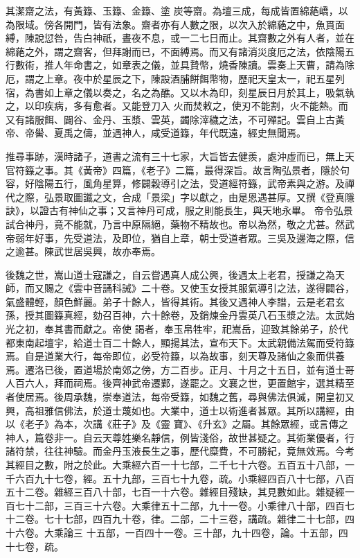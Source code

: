 \begin{pinyinscope}
 其潔齋之法，有黃籙、玉籙、金籙、塗
 炭等齋。為壇三成，每成皆置綿蕝嶠，以為限域。傍各開門，皆有法象。齋者亦有人數之限，以次入於綿蕝之中，魚貫面縛，陳說愆咎，告白神祇，晝夜不息，或一二七日而止。其齋數之外有人者，並在綿蕝之外，謂之齋客，但拜謝而已，不面縛焉。而又有諸消災度厄之法，依陰陽五行數術，推人年命書之，如章表之儀，並具贄幣，燒香陳讀。雲奏上天曹，請為除厄，謂之上章。夜中於星辰之下，陳設酒脯餅餌幣物，歷祀天皇太一，祀五星列宿，為書如上章之儀以奏之，名之為醮。又以木為印，刻星辰日月於其上，吸氣執之，以印疾病，多有愈者。又能登刀入
 火而焚敕之，使刃不能割，火不能熱。而又有諸服餌、闢谷、金丹、玉漿、雲英，蠲除滓穢之法，不可殫記。雲自上古黃帝、帝嚳、夏禹之儔，並遇神人，咸受道籙，年代既遠，經史無聞焉。



 推尋事跡，漢時諸子，道書之流有三十七家，大旨皆去健羨，處沖虛而已，無上天官符籙之事。其《黃帝》四篇，《老子》二篇，最得深旨。故言陶弘景者，隱於句容，好陰陽五行，風角星算，修闢穀導引之法，受道經符籙，武帝素與之游。及禪代之際，弘景取圖讖之文，合成「景梁」字以獻之，由是恩遇甚厚。又撰《登真隱訣》，以證古有神仙之事；又言神丹可成，服之則能長生，與天地永畢。
 帝令弘景試合神丹，竟不能就，乃言中原隔絕，藥物不精故也。帝以為然，敬之尤甚。然武帝弱年好事，先受道法，及即位，猶自上章，朝士受道者眾。三吳及邊海之際，信之逾甚。陳武世居吳興，故亦奉焉。



 後魏之世，嵩山道士寇謙之，自云嘗遇真人成公興，後遇太上老君，授謙之為天師，而又賜之《雲中音誦科誡》二十卷。又使玉女授其服氣導引之法，遂得闢谷，氣盛體輕，顏色鮮麗。弟子十餘人，皆得其術。其後又遇神人李譜，云是老君玄孫，授其圖籙真經，劾召百神，六十餘卷，及銷煉金丹雲英八石玉漿之法。太武始光之初，奉其書而獻之。帝使
 謁者，奉玉帛牲牢，祀嵩岳，迎致其餘弟子，於代都東南起壇宇，給道士百二十餘人，顯揚其法，宣布天下。太武親備法駕而受符籙焉。自是道業大行，每帝即位，必受符籙，以為故事，刻天尊及諸仙之象而供養焉。遷洛已後，置道場於南郊之傍，方二百步。正月、十月之十五日，並有道士哥人百六人，拜而祠焉。後齊神武帝遷鄴，遂罷之。文襄之世，更置館宇，選其精至者使居焉。後周承魏，崇奉道法，每帝受籙，如魏之舊，尋與佛法俱滅，開皇初又興，高祖雅信佛法，於道士蔑如也。大業中，道士以術進者甚眾。其所以講經，由以《老子》為本，次講《莊子》及《靈
 寶》、《升玄》之屬。其餘眾經，或言傳之神人，篇卷非一。自云天尊姓樂名靜信，例皆淺俗，故世甚疑之。其術業優者，行諸符禁，往往神驗。而金丹玉液長生之事，歷代糜費，不可勝紀，竟無效焉。今考其經目之數，附之於此。大乘經六百一十七部，二千七十六卷。五百五十八部，一千六百九十七卷，經。五十九部，三百七十九卷，疏。小乘經四百八十七部，八百五十二卷。雜經三百八十部，七百一十六卷。雜經目殘缺，其見數如此。雜疑經一百七十二部，三百三十六卷。大乘律五十二部，九十一卷。小乘律八十部，四百七十二卷。七十七部，四百九十卷，律。二部，二十三卷，講疏。雜律二十七部，四十六卷。大乘論三
 十五部，一百四十一卷。三十部，九十四卷，論。十五部，四十七卷，疏。




\end{pinyinscope}
